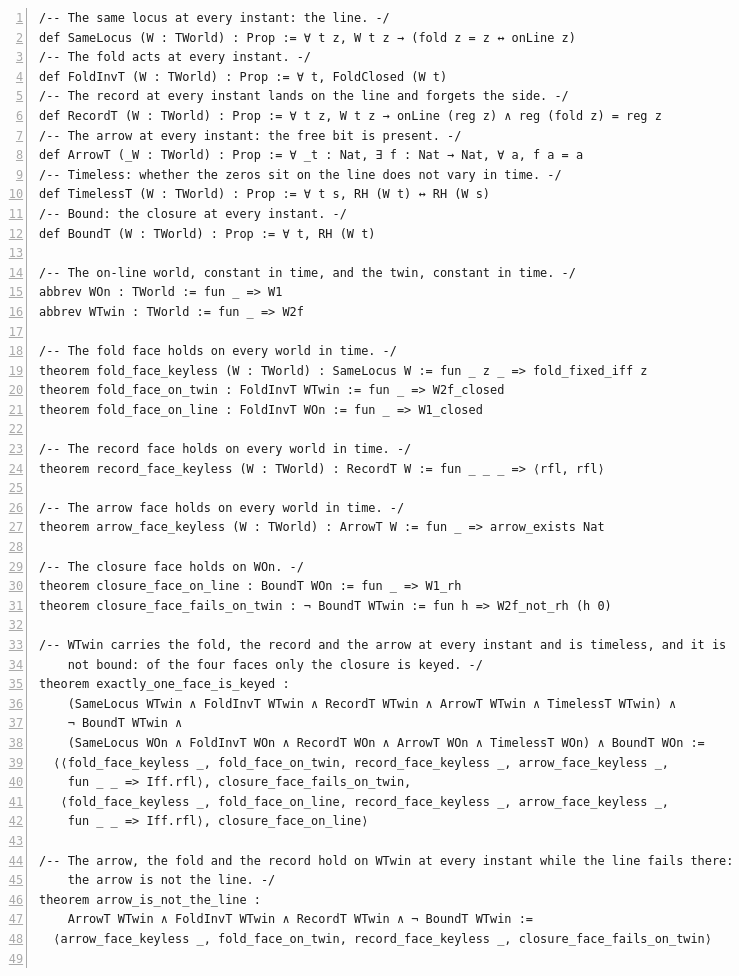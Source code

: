 \documentclass[10pt]{article}
\newcommand{\leansize}{\fontsize{5.5pt}{6.75pt}\selectfont}
\begin{document}
\begin{multicols}{2}
\begin{Verbatim}[numbers=left,firstnumber=1,numbersep=3pt,xleftmargin=2.6em,breaklines=true,breakanywhere=true,breakautoindent=false,breakindent=1.4em,breaksymbolleft={},breakanywheresymbolpre={},fontsize=\leansize]
/-- The same locus at every instant: the line. -/
def SameLocus (W : TWorld) : Prop := ∀ t z, W t z → (fold z = z ↔ onLine z)
/-- The fold acts at every instant. -/
def FoldInvT (W : TWorld) : Prop := ∀ t, FoldClosed (W t)
/-- The record at every instant lands on the line and forgets the side. -/
def RecordT (W : TWorld) : Prop := ∀ t z, W t z → onLine (reg z) ∧ reg (fold z) = reg z
/-- The arrow at every instant: the free bit is present. -/
def ArrowT (_W : TWorld) : Prop := ∀ _t : Nat, ∃ f : Nat → Nat, ∀ a, f a = a
/-- Timeless: whether the zeros sit on the line does not vary in time. -/
def TimelessT (W : TWorld) : Prop := ∀ t s, RH (W t) ↔ RH (W s)
/-- Bound: the closure at every instant. -/
def BoundT (W : TWorld) : Prop := ∀ t, RH (W t)

/-- The on-line world, constant in time, and the twin, constant in time. -/
abbrev WOn : TWorld := fun _ => W1
abbrev WTwin : TWorld := fun _ => W2f

/-- The fold face holds on every world in time. -/
theorem fold_face_keyless (W : TWorld) : SameLocus W := fun _ z _ => fold_fixed_iff z
theorem fold_face_on_twin : FoldInvT WTwin := fun _ => W2f_closed
theorem fold_face_on_line : FoldInvT WOn := fun _ => W1_closed

/-- The record face holds on every world in time. -/
theorem record_face_keyless (W : TWorld) : RecordT W := fun _ _ _ => ⟨rfl, rfl⟩

/-- The arrow face holds on every world in time. -/
theorem arrow_face_keyless (W : TWorld) : ArrowT W := fun _ => arrow_exists Nat

/-- The closure face holds on WOn. -/
theorem closure_face_on_line : BoundT WOn := fun _ => W1_rh
theorem closure_face_fails_on_twin : ¬ BoundT WTwin := fun h => W2f_not_rh (h 0)

/-- WTwin carries the fold, the record and the arrow at every instant and is timeless, and it is
    not bound: of the four faces only the closure is keyed. -/
theorem exactly_one_face_is_keyed :
    (SameLocus WTwin ∧ FoldInvT WTwin ∧ RecordT WTwin ∧ ArrowT WTwin ∧ TimelessT WTwin) ∧
    ¬ BoundT WTwin ∧
    (SameLocus WOn ∧ FoldInvT WOn ∧ RecordT WOn ∧ ArrowT WOn ∧ TimelessT WOn) ∧ BoundT WOn :=
  ⟨⟨fold_face_keyless _, fold_face_on_twin, record_face_keyless _, arrow_face_keyless _,
    fun _ _ => Iff.rfl⟩, closure_face_fails_on_twin,
   ⟨fold_face_keyless _, fold_face_on_line, record_face_keyless _, arrow_face_keyless _,
    fun _ _ => Iff.rfl⟩, closure_face_on_line⟩

/-- The arrow, the fold and the record hold on WTwin at every instant while the line fails there:
    the arrow is not the line. -/
theorem arrow_is_not_the_line :
    ArrowT WTwin ∧ FoldInvT WTwin ∧ RecordT WTwin ∧ ¬ BoundT WTwin :=
  ⟨arrow_face_keyless _, fold_face_on_twin, record_face_keyless _, closure_face_fails_on_twin⟩


\end{Verbatim}
\end{multicols}
\end{document}
